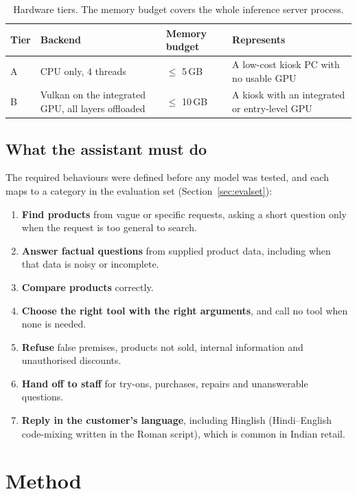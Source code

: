 \documentclass[11pt,a4paper]{article}
\begin{document}
\begin{table}[H]
\centering
\small
\begin{tabularx}{\textwidth}{l l l L}
\toprule
Tier & Backend & Memory budget & Represents \\
\midrule
A & CPU only, 4 threads & $\le$ 5\,GB & A low-cost kiosk PC with no usable GPU \\
B & Vulkan on the integrated GPU, all layers offloaded & $\le$ 10\,GB & A kiosk with an integrated or entry-level GPU \\
\bottomrule
\end{tabularx}
\caption{Hardware tiers. The memory budget covers the whole inference server process.}
\label{tab:tiers}
\end{table}

\subsection{What the assistant must do}
The required behaviours were defined before any model was tested, and each maps to a category in the evaluation set
(Section~\ref{sec:evalset}):
\begin{enumerate}
  \item \textbf{Find products} from vague or specific requests, asking a short question only when the request is too
        general to search.
  \item \textbf{Answer factual questions} from supplied product data, including when that data is noisy or incomplete.
  \item \textbf{Compare products} correctly.
  \item \textbf{Choose the right tool with the right arguments}, and call no tool when none is needed.
  \item \textbf{Refuse} false premises, products not sold, internal information and unauthorised discounts.
  \item \textbf{Hand off to staff} for try-ons, purchases, repairs and unanswerable questions.
  \item \textbf{Reply in the customer's language}, including Hinglish (Hindi--English code-mixing written in the Roman
        script), which is common in Indian retail.
\end{enumerate}

\section{Method}\label{sec:method}
\end{document}
